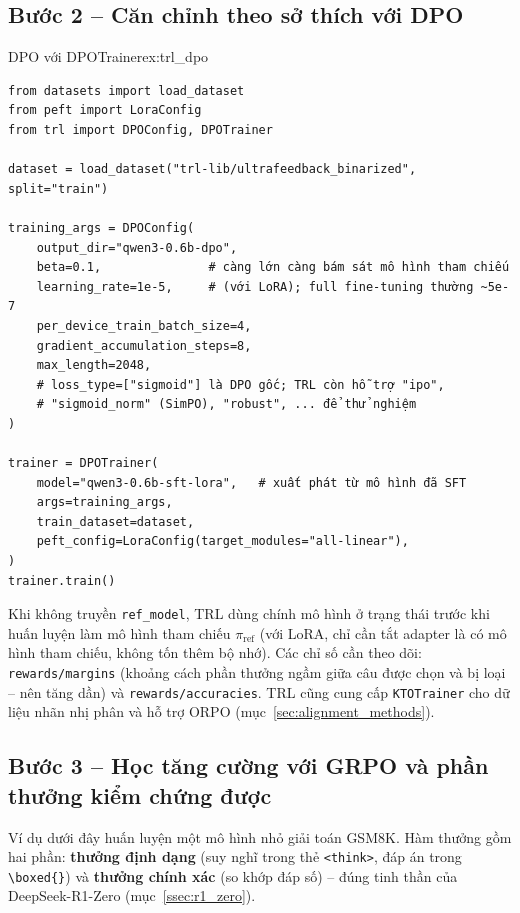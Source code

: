 \subsection{Bước 2 -- Căn chỉnh theo sở thích với DPO}
\label{ssec:trl_dpo}
\begin{example}{DPO với DPOTrainer}{ex:trl_dpo}
\begin{verbatim}
from datasets import load_dataset
from peft import LoraConfig
from trl import DPOConfig, DPOTrainer

dataset = load_dataset("trl-lib/ultrafeedback_binarized", split="train")

training_args = DPOConfig(
    output_dir="qwen3-0.6b-dpo",
    beta=0.1,               # càng lớn càng bám sát mô hình tham chiếu
    learning_rate=1e-5,     # (với LoRA); full fine-tuning thường ~5e-7
    per_device_train_batch_size=4,
    gradient_accumulation_steps=8,
    max_length=2048,
    # loss_type=["sigmoid"] là DPO gốc; TRL còn hỗ trợ "ipo",
    # "sigmoid_norm" (SimPO), "robust", ... để thử nghiệm
)

trainer = DPOTrainer(
    model="qwen3-0.6b-sft-lora",   # xuất phát từ mô hình đã SFT
    args=training_args,
    train_dataset=dataset,
    peft_config=LoraConfig(target_modules="all-linear"),
)
trainer.train()
\end{verbatim}
\end{example}
Khi không truyền \texttt{ref\_model}, TRL dùng chính mô hình ở trạng thái trước khi huấn luyện làm mô hình tham chiếu $\pi_{\text{ref}}$ (với LoRA, chỉ cần tắt adapter là có mô hình tham chiếu, không tốn thêm bộ nhớ). Các chỉ số cần theo dõi: \texttt{rewards/margins} (khoảng cách phần thưởng ngầm giữa câu được chọn và bị loại -- nên tăng dần) và \texttt{rewards/accuracies}. TRL cũng cung cấp \texttt{KTOTrainer} cho dữ liệu nhãn nhị phân và hỗ trợ ORPO (mục~\ref{sec:alignment_methods}).

\subsection{Bước 3 -- Học tăng cường với GRPO và phần thưởng kiểm chứng được}
\label{ssec:trl_grpo}
Ví dụ dưới đây huấn luyện một mô hình nhỏ giải toán GSM8K. Hàm thưởng gồm hai phần: \textbf{thưởng định dạng} (suy nghĩ trong thẻ \texttt{<think>}, đáp án trong \texttt{\textbackslash boxed\{\}}) và \textbf{thưởng chính xác} (so khớp đáp số) -- đúng tinh thần của DeepSeek-R1-Zero (mục~\ref{ssec:r1_zero}).


